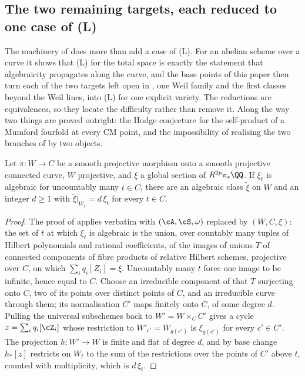 \subsection{The two remaining targets, each reduced to one case of (L)}
\label{ssec:targets}

The machinery of  does more than add a case of
\textup{(L)}. For an abelian scheme over a curve it shows that \textup{(L)}
for the total space is exactly the statement that algebraicity propagates
along the curve, and the base points of this paper then turn each of the two
targets left open in , one Weil family and the first
classes beyond the Weil lines, into \textup{(L)} for one explicit variety. The
reductions are equivalences, so they locate the difficulty rather than remove
it. Along the way two things are proved outright: the Hodge conjecture for the
self-product of a Mumford fourfold at every CM point, and the impossibility of
realising the two branches of  by two objects.

\begin{lemma}\label{lem:spreading}
Let $\pi\colon W\to C$ be a smooth projective morphism onto a smooth projective
connected curve, $W$ projective, and $\xi$ a global section of
$R^{2p}\pi_{*}\QQ$. If $\xi_{t}$ is algebraic for uncountably many $t\in C$,
there are an algebraic class $\tilde\xi$ on $W$ and an integer $d\ge1$ with
$\tilde\xi|_{W_{t}}=d\,\xi_{t}$ for every $t\in C$.
\end{lemma}

\begin{proof}
The proof of  applies verbatim with $(\cA,\cS,\omega)$
replaced by $(W,C,\xi)$: the set of $t$ at which $\xi_{t}$ is algebraic is
the union, over countably many tuples of Hilbert polynomials and rational
coefficients, of the images of unions $T$ of connected components of fibre
products of relative Hilbert schemes, projective over $C$, on which
$\sum_{i}q_{i}[Z_{i}]=\xi$. Uncountably many $t$ force one image to be
infinite, hence equal to $C$. Choose an irreducible component of that $T$
surjecting onto $C$, two of its points over distinct points of $C$, and an
irreducible curve through them; its normalisation $C'$ maps finitely onto $C$,
of some degree $d$. Pulling the universal subschemes back to
$W'=W\times_{C}C'$ gives a cycle $z=\sum_{i}q_{i}[\cZ_{i}]$ whose restriction
to $W'_{c'}=W_{g(c')}$ is $\xi_{g(c')}$ for every $c'\in C'$. The projection
$h\colon W'\to W$ is finite and flat of degree $d$, and by base change
$h_{*}[z]$ restricts on $W_{t}$ to the sum of the restrictions over the
points of $C'$ above $t$, counted with multiplicity, which is $d\,\xi_{t}$.
\end{proof}

